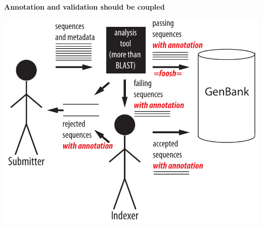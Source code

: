 \documentclass[landscape]{slides}
\begin{document}
\begin{slide}
\begin{center}
\textbf{Annotation and validation should be coupled}
\end{center}

\begin{center}\includegraphics[width=7in]{figs/submission-schematic-4}\end{center}

\vfill
\end{slide}
\end{document}
